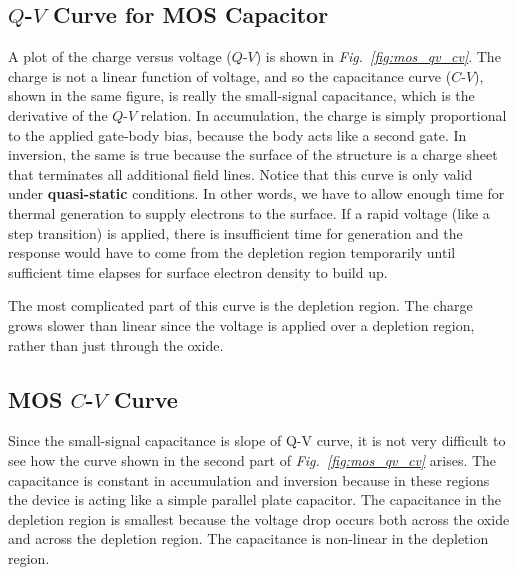 \subsection{\texorpdfstring{$Q$-$V$}{Q-V} Curve for MOS Capacitor}
A plot of the charge versus voltage ($Q$-$V$) is shown in \emph{Fig.~\ref{fig:mos_qv_cv}}.  The charge is not a linear function of voltage, and so the capacitance curve ($C$-$V$), shown in the same figure, is really the small-signal capacitance, which is the derivative of the $Q$-$V$ relation.  In accumulation, the charge is simply proportional to the applied gate-body bias, because the body acts like a second gate.  In inversion, the same is true because the surface of the structure is a charge sheet that terminates all additional field lines.  Notice that this curve is only valid under \textbf{quasi-static} conditions.  In other words, we have to allow enough time for thermal generation to supply electrons to the surface.  If a rapid voltage (like a step transition) is applied, there is insufficient time for generation and the response would have to come from the depletion region temporarily until sufficient time elapses for surface electron density to build up.  

The most complicated part of this curve is the depletion region.  The charge grows slower than linear since the voltage is applied over a depletion region, rather than just through the oxide.  
\subsection{MOS \texorpdfstring{$C$-$V$}{C-V} Curve}
Since the small-signal capacitance is slope of Q-V curve, it is not very difficult to see how the curve shown in the second part of \emph{Fig.~\ref{fig:mos_qv_cv}} arises.  The capacitance is constant in accumulation and inversion because in these regions the device is acting like a simple parallel plate capacitor.  The capacitance in the depletion region is smallest because the voltage drop occurs both across the oxide and across the depletion region.  The capacitance is non-linear in the depletion region.  
